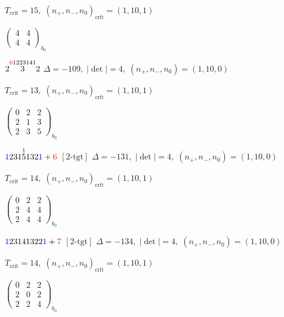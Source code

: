 \documentclass[10pt]{article}
\begin{document}
\hspace{1em}$T_{\text{crit}}=15,\; (n_+,n_-,n_0)_{\text{crit}}=(1,10,1)$

\hspace{2em}$\left(\begin{smallmatrix}4 & 4 \\ 4 & 4\end{smallmatrix}\right)_{\!b_0}$

\smallskip

$2\overset{\textcolor{red}{6}1223141}{3}2$ \quad $\Delta=-109,\; |\det|=4,\; (n_+,n_-,n_0)=(1,10,0)$

\hspace{1em}$T_{\text{crit}}=13,\; (n_+,n_-,n_0)_{\text{crit}}=(1,10,1)$

\hspace{2em}$\left(\begin{smallmatrix}0 & 2 & 2 \\ 2 & 1 & 3 \\ 2 & 3 & 5\end{smallmatrix}\right)_{\!b_0}$

\smallskip

$\textcolor{blue}{1}231\overset{1}{5}132\textcolor{blue}{1}+\textcolor{red}{6}$ $\scriptstyle [2\text{-tgt}]$ \quad $\Delta=-131,\; |\det|=4,\; (n_+,n_-,n_0)=(1,10,0)$

\hspace{1em}$T_{\text{crit}}=14,\; (n_+,n_-,n_0)_{\text{crit}}=(1,10,1)$

\hspace{2em}$\left(\begin{smallmatrix}0 & 2 & 2 \\ 2 & 4 & 4 \\ 2 & 4 & 4\end{smallmatrix}\right)_{\!b_0}$

\smallskip

$\textcolor{blue}{1}23141322\textcolor{blue}{1}+\textcolor{red}{7}$ $\scriptstyle [2\text{-tgt}]$ \quad $\Delta=-134,\; |\det|=4,\; (n_+,n_-,n_0)=(1,10,0)$

\hspace{1em}$T_{\text{crit}}=14,\; (n_+,n_-,n_0)_{\text{crit}}=(1,10,1)$

\hspace{2em}$\left(\begin{smallmatrix}0 & 2 & 2 \\ 2 & 0 & 2 \\ 2 & 2 & 4\end{smallmatrix}\right)_{\!b_0}$
\end{document}
